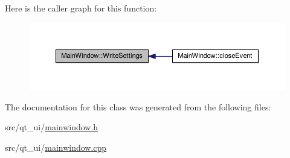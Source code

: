Here is the caller graph for this function\+:\nopagebreak
\begin{figure}[H]
\begin{center}
\leavevmode
\includegraphics[width=350pt]{class_main_window_a56a5e4d5e0a022e8c1ecf350d2916ade_icgraph}
\end{center}
\end{figure}




The documentation for this class was generated from the following files\+:\begin{DoxyCompactItemize}
\item 
src/qt\+\_\+ui/\hyperlink{mainwindow_8h}{mainwindow.\+h}\item 
src/qt\+\_\+ui/\hyperlink{mainwindow_8cpp}{mainwindow.\+cpp}\end{DoxyCompactItemize}
